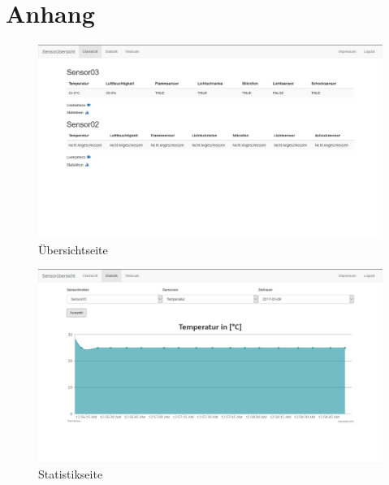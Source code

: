 \chapter*{Anhang}
\begin{landscape}
	\begin{figure}[htb]
		\includegraphics[width=\linewidth, height=.9\textheight]{Bilder/Anhang/uebersicht.jpg}
		\caption[]{Übersichtseite}
		\label{uebersichtseite}
	\end{figure}
\end{landscape}
\begin{landscape}
	\begin{figure}[htb]
		\includegraphics[width=\linewidth, height=.9\textheight]{Bilder/Anhang/statistik.jpg}
		\caption[]{Statistikseite}
		\label{statistikseite}
	\end{figure}
\end{landscape}
